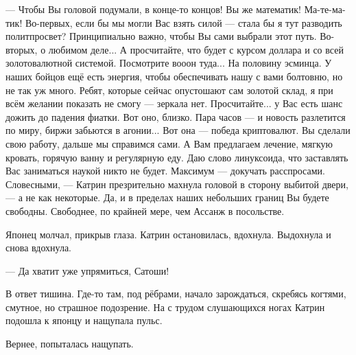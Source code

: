 --- Чтобы Вы головой подумали, в конце-то концов! Вы же математик! Ма-те-ма-тик!
Во-первых, если бы мы могли Вас взять силой --- стала бы я тут разводить политпросвет?
Принципиально важно, чтобы Вы сами выбрали этот путь. Во-вторых, о любимом деле...
А просчитайте, что будет с курсом доллара и со всей золотовалютной системой. Посмотрите вооон туда...
На половину эсминца. У наших бойцов ещё есть энергия, чтобы обеспечивать нашу с вами болтовню, но не так уж много.
Ребят, которые сейчас опустошают сам золотой склад, я при всём желании показать не смогу --- зеркала нет.
Просчитайте... у Вас есть шанс дожить до падения фиатки. Вот оно, близко.
Пара часов --- и новость разлетится по миру, биржи забьются в агонии... Вот она --- победа криптовалют.
Вы сделали свою работу, дальше мы справимся сами. А Вам предлагаем лечение, мягкую кровать, горячую ванну и регулярную еду.
Даю слово линуксоида, что заставлять Вас заниматься наукой никто не будет. Максимум --- докучать расспросами.
Словесными, --- Катрин презрительно махнула головой в сторону выбитой двери, --- а не как некоторые.
Да, и в пределах наших небольших границ Вы будете свободны. Свободнее, по крайней мере, чем Ассанж в посольстве.

Японец молчал, прикрыв глаза. Катрин остановилась, вдохнула. Выдохнула и снова вдохнула.

--- Да хватит уже упрямиться, Сатоши!

В ответ тишина. Где-то там, под рёбрами, начало зарождаться, скребясь когтями, смутное, но страшное подозрение.
На с трудом слушающихся ногах Катрин подошла к японцу и нащупала пульс.

Вернее, попыталась нащупать.




